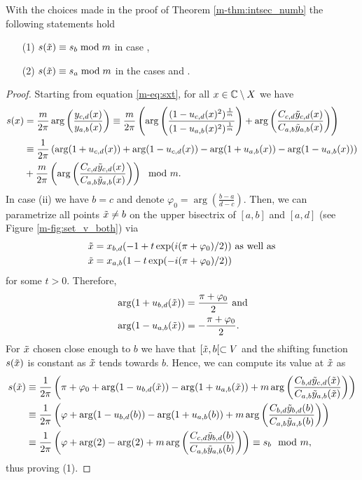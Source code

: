 \documentclass[main.tex]{subfiles}
\begin{document}
\begin{lemma}\label{lemma:sxt=sx}
  With the choices made in the proof of Theorem \ref{m-thm:intsec_numb} the following statements hold
  \begin{itemize}
   \item[(1)] $s(\tilde{x}) \equiv s_b \bmod m$ in case {},
    \item[(2)]  $s(\tilde{x}) \equiv s_a \bmod m$ in the cases {} and {}.
  \end{itemize}
\end{lemma}
 \begin{proof}
 Starting from equation \eqref{m-eq:sxt}, for all $x \in \mathbb{C} \setminus X$ we have
   \begin{align*}
   s(x) & = \frac{m}{2\pi} \arg \left( \frac{y_{c,d}(x)}{y_{a,b}(x)} \right)
   \equiv \frac{m}{2\pi} \left( \arg \left( \frac{(1- u_{c,d}(x)^2)^{\frac{1}{m}}}{(1-u_{a,b}(x)^2)^{\frac{1}{m}}} \right) + \arg \left( \frac{ C_{c,d} \tilde{y}_{c,d}(x)}{C_{a,b}
   \tilde{y}_{a,b}(x)} \right) \right) \\
   & \equiv \frac{1}{2\pi} \left( \arg(1+u_{c,d}(x)) + \arg(1-u_{c,d}(x)) - \arg(1+u_{a,b}(x)) - \arg(1-u_{a,b}(x)) \right) \\
   & +  \frac{m}{2\pi} \left( \arg \left( \frac{ C_{c,d} \tilde{y}_{c,d}(x)}{C_{a,b}\tilde{y}_{a,b}(x)} \right)\right) \mod m.
  \end{align*}
 In case (ii) we have $b = c$ and denote $\varphi_0 = \arg \left( \frac{b-a}{d-c} \right)$. Then, we can parametrize all points $\tilde{x} \ne b$ on
 the upper bisectrix of $[a,b]$ and
 $[a,d]$ (see Figure \ref{m-fig:set_v_both}) via
 \begin{align*}
  \tilde{x} & = x_{b,d}(-1+t \exp(i(\pi+\varphi_0)/2)) \text{  as well as} \\
  \tilde{x} & = x_{a,b}(1-t \exp(-i (\pi+\varphi_0)/2))
 \end{align*}
 for some $t > 0$. Therefore,
 \begin{align*}
   & \arg (1+u_{b,d}(\tilde{x})) = \frac{\pi+\varphi_0}{2} \text{ and} \\
   & \arg (1-u_{a,b}(\tilde{x})) = -\frac{\pi+\varphi_0}{2}.
 \end{align*}
 For $\tilde{x}$ chosen close enough to $b$ we have that $[\tilde{x},b[ \subset V$ and the shifting function $s(\tilde{x})$ is constant as $\tilde{x}$ tends towards $b$. Hence,
 we can compute its value at $\tilde{x}$ as
 \begin{align*}
  s(\tilde{x}) & \equiv \frac{1}{2\pi} \left( \pi + \varphi_0 + \arg(1-u_{b,d}(\tilde{x})) - \arg(1+u_{a,b}(\tilde{x})) +  m \arg \left( \frac{ C_{b,d} \tilde{y}_{c,d}(\tilde{x})}{C_{a,b}\tilde{y}_{a,b}(\tilde{x})} \right)\right) \\
	 & \equiv \frac{1}{2\pi} \left ( \varphi +\arg(1-u_{b,d}(b)) - \arg(1+u_{a,b}(b)) +  m \arg \left( \frac{ C_{b,d} \tilde{y}_{b,d}(b)}{C_{a,b}\tilde{y}_{a,b}(b)} \right)\right) \\
	 & \equiv \frac{1}{2\pi} \left( \varphi +\arg(2) - \arg(2) +  m \arg \left( \frac{ C_{c,d} \tilde{y}_{b,d}(b)}{C_{a,b}\tilde{y}_{a,b}(b)} \right)\right) \equiv s_b \mod m,
 \end{align*}
thus proving (1).


\end{proof}
\end{document}
